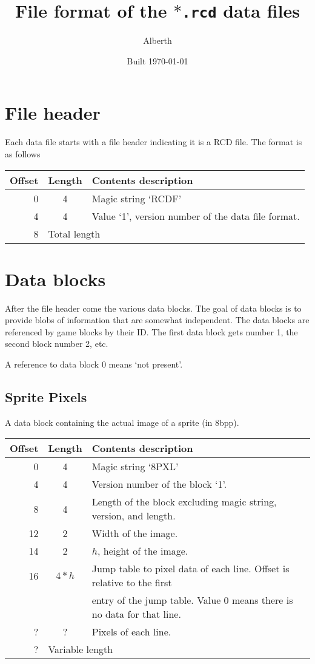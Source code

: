 \documentclass{article}
\title{File format of the \texttt{$*$.rcd} data files}
\author{Alberth}
\date{Built \today}
\begin{document}
\maketitle
\tableofcontents

\section{File header}
Each data file starts with a file header indicating it is a RCD{} file.
The format is as follows

\begin{center}
\begin{tabular}{|r|c|l|} \hline
\textbf{Offset} & \textbf{Length} & \textbf{Contents description} \\ \hline
0 & 4 & Magic string `RCDF' \\
4 & 4 & Value `1', version number of the data file format. \\ \hline
8 & \multicolumn{2}{l|}{Total length} \\ \hline
\end{tabular}
\end{center}

\section{Data blocks}
After the file header come the various data blocks.
The goal of data blocks is to provide blobs of information that are somewhat independent.
The data blocks are referenced by game blocks by their ID. The first data block
gets number 1, the second block number 2, etc.

A reference to data block 0 means `not present'.


\subsection{Sprite Pixels}
A data block containing the actual image of a sprite (in 8bpp).

\begin{center}
\begin{tabular}{|r|c|l|} \hline
\textbf{Offset} & \textbf{Length} & \textbf{Contents description} \\ \hline
 0 & 4 & Magic string `8PXL' \\
 4 & 4 & Version number of the block `1'. \\
 8 & 4 & Length of the block excluding magic string, version, and length. \\
12 & 2 & Width of the image. \\
14 & 2 & $h$, height of the image. \\
16 & $4*h$ & Jump table to pixel data of each line. Offset is relative to the first \\
   &       & entry of the jump table. Value 0 means there is no data for that line. \\
 ? &    ?  & Pixels of each line. \\ \hline
 ? & \multicolumn{2}{l|}{Variable length} \\ \hline
\end{tabular}
\end{center}
\end{document}
